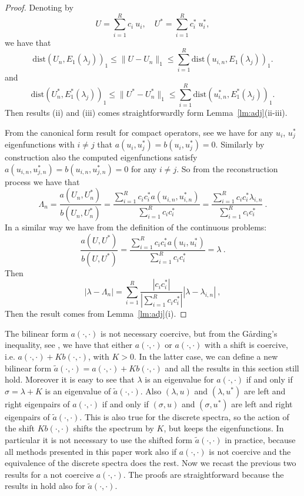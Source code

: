 \documentclass[smallextended]{svjour3}
\begin{document}
\begin{proof}
Denoting by 
$$
U=\sum_{i=1}^{R} c_i \ u_{i},\quad U^*=\sum_{i=1}^{R} c_i^* \ u_{i}^*,
$$
we have that
$$
\mathrm{dist}(
U_n,E_1(\lambda_j))_{1}\leq \|U-U_n\|_{1}\leq \sum_{i=1}^{R} \mathrm{dist}(
u_{i,n},E_1(\lambda_j))_{1}.
$$
and
$$
\mathrm{dist}(
U_n^*,E_1^*(\lambda_j))_{1}\leq \|U^*-U_n^*\|_{1}\leq \sum_{i=1}^{R} \mathrm{dist}(
u_{i,n}^*,E_1^*(\lambda_j))_{1}.
$$
Then results (ii) and (iii) comes straightforwardly form Lemma~\ref{lm:adj}(ii-iii).


From the canonical form result for compact operators, see \cite[Theorem~9.17]{Hislop} we have for any $u_i$, $u_j^*$ eigenfunctions with $i\neq j$ that $a(u_i,u_j^*)=b(u_i,u_j^*)=0$.
Similarly by construction also the computed eigenfunctions satisfy $a(u_{i,n},u_{j,n}^*)=b(u_{i,n},u_{j,n}^*)=0$ for any $i\neq j$.
So from the reconstruction process we have that
$$
\Lambda_n=\frac{a(U_n,U_n^*)}{b(U_n,U_n^*)}=\frac{\sum_{i=1}^{R} c_ic_i^*a(u_{i,n},u_{i,n}^*)}{\sum_{i=1}^{R} c_ic_i^*}
=\frac{\sum_{i=1}^{R} c_ic_i^*\lambda_{i,n}}{\sum_{i=1}^{R} c_ic_i^*}\ .
$$
In a similar way we have from the definition of the continuous problems:
$$
\frac{a(U,U^*)}{b(U,U^*)}=\frac{\sum_{i=1}^{R} c_ic_i^*a(u_{i},u_{i}^*)}{\sum_{i=1}^{R} c_ic_i^*}=\lambda\ .
$$
Then
$$
|\lambda-\Lambda_n|=\sum_{i=1}^{R}\frac{|c_ic_i^*|}{|\sum_{i=1}^{R} c_ic_i^*|}|\lambda-\lambda_{i,n}| \ ,
$$
Then the result comes from Lemma~\ref{lm:adj}(i).



\end{proof}

The bilinear form $a(\cdot,\cdot)$ is not necessary coercive, but from the G\r{a}rding's inequality, see \cite[Theorem~(5.6.8)]{Brenner}, we have that either $a(\cdot,\cdot)$ or $a(\cdot,\cdot)$ with a shift is coercive, i.e. $a(\cdot,\cdot)+K b(\cdot,\cdot)$, with $K>0$. In the latter case, we can define a new bilinear form $\tilde a(\cdot,\cdot)=a(\cdot,\cdot)+K b(\cdot,\cdot)$ and all the results in this section still hold. Moreover it is easy to see that $\lambda$ is an eigenvalue for $a(\cdot,\cdot)$ if and only if $\sigma=\lambda+K$ is an eigenvalue of $\tilde  a(\cdot,\cdot)$. Also $(\lambda,u)$ and $(\lambda,u^*)$ are left and right eigenpairs of $a(\cdot,\cdot)$ if and only if $(\sigma,u)$ and $(\sigma,u^*)$ are left and right eigenpairs of $\tilde  a(\cdot,\cdot)$. This is also true for the discrete spectra, so the action of the shift $K b(\cdot,\cdot)$ shifts the spectrum by $K$, but keeps the eigenfunctions. In particular it is not necessary to use the shifted form $\tilde a(\cdot,\cdot)$ in practice, because all methods presented in this paper work also if $a(\cdot,\cdot)$ is not coercive and the equivalence of the discrete spectra does the rest. Now we recast the previous two results for a not coercive  $a(\cdot,\cdot)$. The proofs are straightforward because the results in \cite{babuska} hold also for $\tilde a(\cdot,\cdot)$.
\end{document}
